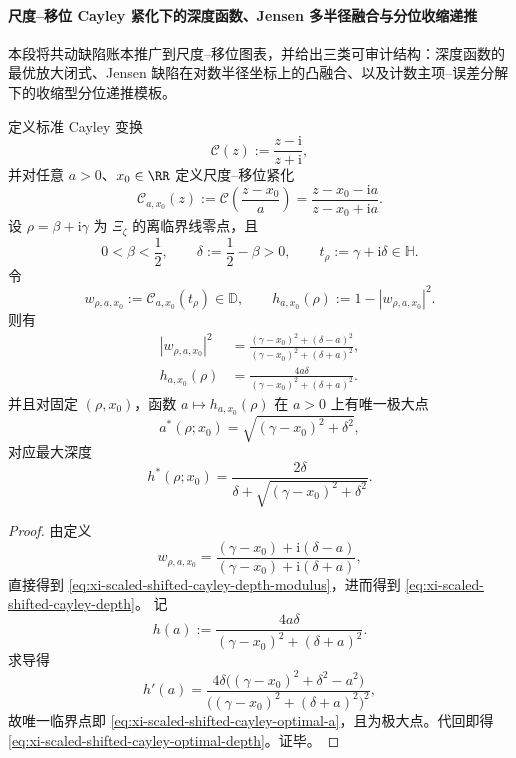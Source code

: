 \paragraph{尺度--移位 Cayley 紧化下的深度函数、Jensen 多半径融合与分位收缩递推}
本段将共动缺陷账本推广到尺度--移位图表，并给出三类可审计结构：深度函数的最优放大闭式、Jensen 缺陷在对数半径坐标上的凸融合、以及计数主项--误差分解下的收缩型分位递推模板。

\begin{theorem}\label{thm:xi-scaled-shifted-cayley-depth-optimal-scale}
定义标准 Cayley 变换
\[
\mathcal C(z):=\frac{z-\mathrm{i}}{z+\mathrm{i}},
\]
并对任意 \(a>0\)、\(x_0\in\RR\) 定义尺度--移位紧化
\[
\mathcal C_{a,x_0}(z):=\mathcal C\!\left(\frac{z-x_0}{a}\right)
=\frac{z-x_0-\mathrm{i}a}{z-x_0+\mathrm{i}a}.
\]
设 \(\rho=\beta+\mathrm{i}\gamma\) 为 \(\Xi_\zeta\) 的离临界线零点，且
\[
0<\beta<\frac12,\qquad
\delta:=\frac12-\beta>0,\qquad
t_\rho:=\gamma+\mathrm{i}\delta\in\mathbb H.
\]
令
\[
w_{\rho,a,x_0}:=\mathcal C_{a,x_0}(t_\rho)\in\mathbb D,\qquad
h_{a,x_0}(\rho):=1-|w_{\rho,a,x_0}|^2.
\]
则有
\begin{align}
|w_{\rho,a,x_0}|^2
&=\frac{(\gamma-x_0)^2+(\delta-a)^2}{(\gamma-x_0)^2+(\delta+a)^2},\label{eq:xi-scaled-shifted-cayley-depth-modulus}\\
h_{a,x_0}(\rho)
&=\frac{4a\delta}{(\gamma-x_0)^2+(\delta+a)^2}.\label{eq:xi-scaled-shifted-cayley-depth}
\end{align}
并且对固定 \((\rho,x_0)\)，函数 \(a\mapsto h_{a,x_0}(\rho)\) 在 \(a>0\) 上有唯一极大点
\begin{equation}\label{eq:xi-scaled-shifted-cayley-optimal-a}
a^\ast(\rho;x_0)=\sqrt{(\gamma-x_0)^2+\delta^2},
\end{equation}
对应最大深度
\begin{equation}\label{eq:xi-scaled-shifted-cayley-optimal-depth}
h^\ast(\rho;x_0)
=\frac{2\delta}{\delta+\sqrt{(\gamma-x_0)^2+\delta^2}}.
\end{equation}
\end{theorem}
\begin{proof}
由定义
\[
w_{\rho,a,x_0}
=\frac{(\gamma-x_0)+\mathrm{i}(\delta-a)}{(\gamma-x_0)+\mathrm{i}(\delta+a)},
\]
直接得到 \eqref{eq:xi-scaled-shifted-cayley-depth-modulus}，进而得到
\eqref{eq:xi-scaled-shifted-cayley-depth}。
记
\[
h(a):=\frac{4a\delta}{(\gamma-x_0)^2+(\delta+a)^2}.
\]
求导得
\[
h'(a)=\frac{4\delta\bigl((\gamma-x_0)^2+\delta^2-a^2\bigr)}
{\bigl((\gamma-x_0)^2+(\delta+a)^2\bigr)^2},
\]
故唯一临界点即 \eqref{eq:xi-scaled-shifted-cayley-optimal-a}，且为极大点。代回即得
\eqref{eq:xi-scaled-shifted-cayley-optimal-depth}。证毕。
\end{proof}

